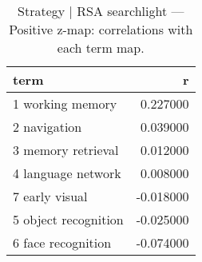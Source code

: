 \begin{table}
\caption{Strategy | RSA searchlight — Positive z-map: correlations with each term map.}
\label{tab:Strategy | RSA searchlight_pos}
\begin{tabular}{lr}
\toprule
term & r \\
\midrule
1 working memory & 0.227000 \\
2 navigation & 0.039000 \\
3 memory retrieval & 0.012000 \\
4 language network & 0.008000 \\
7 early visual & -0.018000 \\
5 object recognition & -0.025000 \\
6 face recognition & -0.074000 \\
\bottomrule
\end{tabular}
\end{table}

